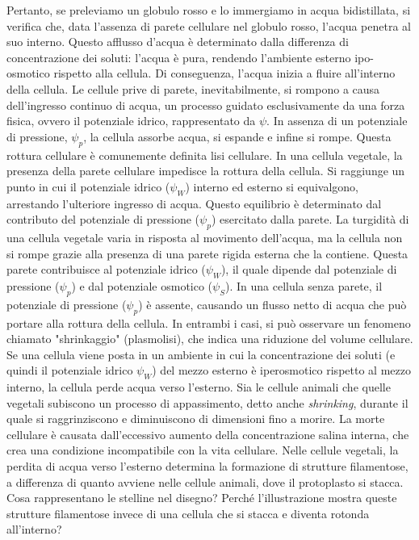 \documentclass[11pt, a4paper]{article}
\begin{document}
\begin{spacing}{1}
Pertanto, se preleviamo un globulo rosso e lo immergiamo in acqua bidistillata, si verifica che, data l'assenza di parete cellulare nel globulo rosso, l'acqua penetra al suo interno. Questo afflusso d'acqua è determinato dalla differenza di concentrazione dei soluti: l'acqua è pura, rendendo l'ambiente esterno ipo-osmotico rispetto alla cellula. Di conseguenza, l'acqua inizia a fluire all'interno della cellula. Le cellule prive di parete, inevitabilmente, si rompono a causa dell'ingresso continuo di acqua, un processo guidato esclusivamente da una forza fisica, ovvero il potenziale idrico, rappresentato da $\psi$. In assenza di un potenziale di pressione, $\psi_p$, la cellula assorbe acqua, si espande e infine si rompe. Questa rottura cellulare è comunemente definita lisi cellulare.
In una cellula vegetale, la presenza della parete cellulare impedisce la rottura della cellula. Si raggiunge un punto in cui il potenziale idrico ($\psi_W$) interno ed esterno si equivalgono, arrestando l'ulteriore ingresso di acqua. Questo equilibrio è determinato dal contributo del potenziale di pressione ($\psi_p$) esercitato dalla parete. La turgidità di una cellula vegetale varia in risposta al movimento dell'acqua, ma la cellula non si rompe grazie alla presenza di una parete rigida esterna che la contiene. Questa parete contribuisce al potenziale idrico ($\psi_W$), il quale dipende dal potenziale di pressione ($\psi_p$) e dal potenziale osmotico ($\psi_S$). In una cellula senza parete, il potenziale di pressione ($\psi_p$) è assente, causando un flusso netto di acqua che può portare alla rottura della cellula. In entrambi i casi, si può osservare un fenomeno chiamato "shrinkaggio" (plasmolisi), che indica una riduzione del volume cellulare.
Se una cellula viene posta in un ambiente in cui la concentrazione dei soluti (e quindi il potenziale idrico $\psi_W$) del mezzo esterno è iperosmotico rispetto al mezzo interno, la cellula perde acqua verso l'esterno. Sia le cellule animali che quelle vegetali subiscono un processo di appassimento, detto anche \textit{shrinking}, durante il quale si raggrinziscono e diminuiscono di dimensioni fino a morire. La morte cellulare è causata dall'eccessivo aumento della concentrazione salina interna, che crea una condizione incompatibile con la vita cellulare. Nelle cellule vegetali, la perdita di acqua verso l'esterno determina la formazione di strutture filamentose, a differenza di quanto avviene nelle cellule animali, dove il protoplasto si stacca. Cosa rappresentano le stelline nel disegno? Perché l'illustrazione mostra queste strutture filamentose invece di una cellula che si stacca e diventa rotonda all'interno?

\end{spacing}
\end{document}
